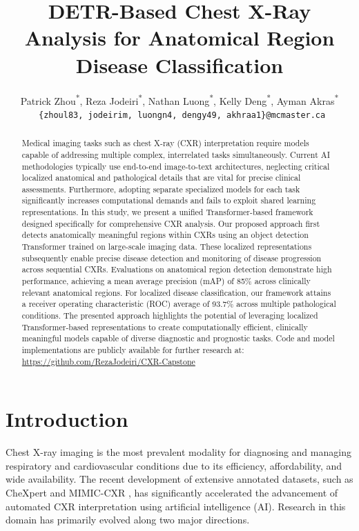 \documentclass[10pt,twocolumn,letterpaper]{article}
\date{}
\title{
		\huge \textbf{DETR-Based Chest X-Ray Analysis for Anatomical Region Disease Classification} \\
}
\author{
    Patrick Zhou\textsuperscript{*}, 
    Reza Jodeiri\textsuperscript{*}, 
    Nathan Luong\textsuperscript{*}, 
    Kelly Deng\textsuperscript{*},
    Ayman Akras\textsuperscript{*}\\
    
    \texttt{ \{zhoul83, jodeirim, luongn4, dengy49, akhraa1\}@mcmaster.ca}}
\affil[]{\small{Department of Computing and Software, McMaster University}}
\begin{document}
\maketitle

\begin{abstract}
Medical imaging tasks such as chest X-ray (CXR) interpretation require models capable of addressing multiple complex, interrelated tasks simultaneously. Current AI methodologies typically use end-to-end image-to-text architectures, neglecting critical localized anatomical and pathological details that are vital for precise clinical assessments. Furthermore, adopting separate specialized models for each task significantly increases computational demands and fails to exploit shared learning representations. In this study, we present a unified Transformer-based framework designed specifically for comprehensive CXR analysis. Our proposed approach first detects anatomically meaningful regions within CXRs using an object detection Transformer trained on large-scale imaging data. These localized representations subsequently enable precise disease detection and monitoring of disease progression across sequential CXRs. Evaluations on anatomical region detection demonstrate high performance, achieving a mean average precision (mAP) of 85\% across clinically relevant anatomical regions. For localized disease classification, our framework attains a receiver operating characteristic (ROC) average of 93.7\% across multiple pathological conditions. The presented approach highlights the potential of leveraging localized Transformer-based representations to create computationally efficient, clinically meaningful models capable of diverse diagnostic and prognostic tasks. Code and model implementations are publicly available for further research at: \href{https://github.com/RezaJodeiri/CXR-Capstone}{https://github.com/RezaJodeiri/CXR-Capstone}
\end{abstract}

\section{Introduction}
Chest X-ray imaging is the most prevalent modality for diagnosing and managing respiratory and cardiovascular conditions due to its efficiency, affordability, and wide availability. The recent development of extensive annotated datasets, such as CheXpert \cite{irvin2019chexpert} and MIMIC-CXR \cite{johnson2019mimiccxr}, has significantly accelerated the advancement of automated CXR interpretation using artificial intelligence (AI). Research in this domain has primarily evolved along two major directions.\\
\end{document}
